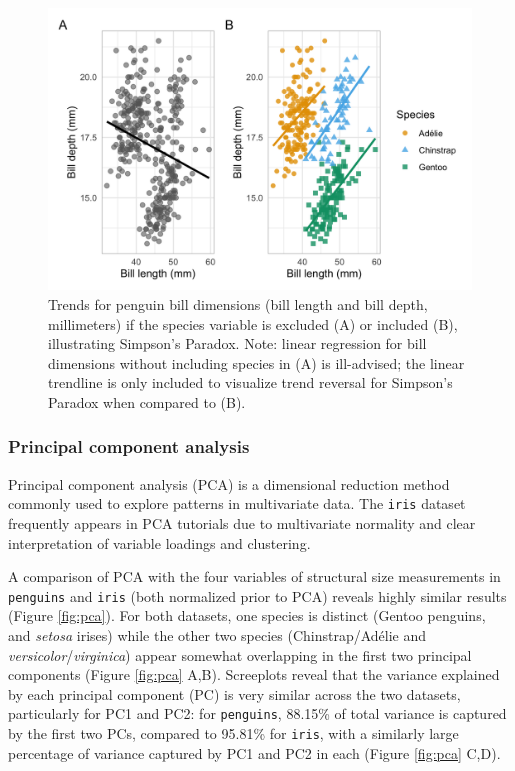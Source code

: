 \begin{Schunk}
\begin{figure}

{\centering \includegraphics[width=\textwidth]{figs/simpsons-1} 

}

\caption[Trends for penguin bill dimensions (bill length and bill depth, millimeters) if the species variable is excluded (A) or included (B), illustrating Simpson’s Paradox]{Trends for penguin bill dimensions (bill length and bill depth, millimeters) if the species variable is excluded (A) or included (B), illustrating Simpson’s Paradox. Note: linear regression for bill dimensions without including species in (A) is ill-advised; the linear trendline is only included to visualize trend reversal for Simpson’s Paradox when compared to (B).}\label{fig:simpsons}
\end{figure}
\end{Schunk}

\hypertarget{principal-component-analysis}{%
\subsubsection{Principal component
analysis}\label{principal-component-analysis}}

Principal component analysis (PCA) is a dimensional reduction method
commonly used to explore patterns in multivariate data. The
\texttt{iris} dataset frequently appears in PCA tutorials due to
multivariate normality and clear interpretation of variable loadings and
clustering.

A comparison of PCA with the four variables of structural size
measurements in \texttt{penguins} and \texttt{iris} (both normalized
prior to PCA) reveals highly similar results (Figure \ref{fig:pca}). For
both datasets, one species is distinct (Gentoo penguins, and
\emph{setosa} irises) while the other two species (Chinstrap/Adélie and
\emph{versicolor}/\emph{virginica}) appear somewhat overlapping in the
first two principal components (Figure \ref{fig:pca} A,B). Screeplots
reveal that the variance explained by each principal component (PC) is
very similar across the two datasets, particularly for PC1 and PC2: for
\texttt{penguins}, 88.15\% of total variance is captured by the first
two PCs, compared to 95.81\% for \texttt{iris}, with a similarly large
percentage of variance captured by PC1 and PC2 in each (Figure
\ref{fig:pca} C,D).

